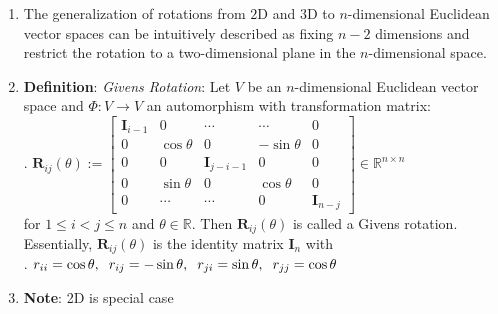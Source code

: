 \begin{enumerate}
    \item The generalization of rotations from $2$D and $3$D to $n$-dimensional Euclidean vector spaces can be intuitively described as fixing $n - 2$ dimensions and restrict the rotation to a two-dimensional plane in the $n$-dimensional space.

    \item \textbf{Definition}: \textit{Givens Rotation}: Let $V$ be an $n$-dimensional Euclidean vector space and $\Phi : V \to V$ an automorphism with transformation matrix:
    \\
    .\hfill
    $
        \bm{R}_{ij} (\theta) := 
        \begin{bmatrix}
            \bm{I}_{i-1} & 0 & \cdots &  \cdots & 0 \\
            0 & \cos \theta & 0 & - \sin \theta & 0\\
            0 & 0 & \bm{I}_{j-i-1} & 0 & 0\\
            0 & \sin \theta &  0 & \cos \theta & 0\\
            0 & \cdots & \cdots & 0 & \bm{I}_{n-j}
        \end{bmatrix}
        \in \mathbb{R}^{n\times n}
    $
    \hfill \cite{mfml/book/mml/Deisenroth-Faisal-Ong}
    \\
    for $1 \leq i < j \leq n$ and $\theta \in \mathbb{R}$. 
    Then $\bm{R}_{ij} (\theta)$ is called a Givens rotation. 
    Essentially, $\bm{R}_{ij} (\theta)$ is the identity matrix $\bm{I}_n$ with
    \hfill \cite{mfml/book/mml/Deisenroth-Faisal-Ong}
    \\
    .\hfill
    $
        r_{ii} = \cos \theta , 
        \hspace{0.2cm}
        r_{ij} = - \sin \theta,
        \hspace{0.2cm}
        r_{ji} = \sin \theta, 
        \hspace{0.2cm}
        r_{jj} = \cos \theta
    $
    \hfill \cite{mfml/book/mml/Deisenroth-Faisal-Ong}

    \item \textbf{Note}: 2D is special case
\end{enumerate}





























